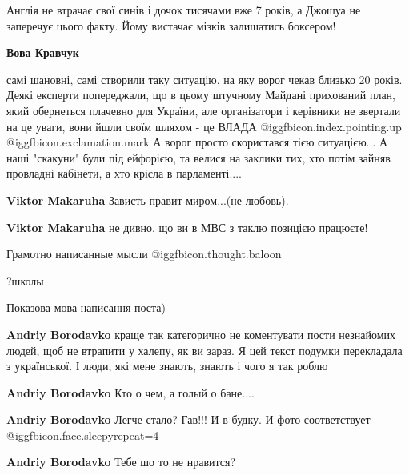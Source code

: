 \begin{itemize}

Англія не втрачає свої синів і дочок тисячами вже 7 років, а Джошуа не
заперечує цього факту. Йому вистачає мізків залишатись боксером!

\begin{itemize} %


\textbf{Вова Кравчук} 

самі шановні, самі створили таку ситуацію, на яку ворог чекав близько 20 років.
Деякі експерти попереджали, що в цьому штучному Майдані прихований план, який
обернеться плачевно для України, але організатори і керівники не звертали на це
уваги, вони йшли своїм шляхом - це ВЛАДА @igg{fbicon.index.pointing.up} ️
@igg{fbicon.exclamation.mark} А ворог просто скористався тією ситуацією... А
наші "скакуни" були під ейфорією, та велися на заклики тих, хто потім зайняв
провладні кабінети, а хто крісла в парламенті....

\textbf{Viktor Makaruha} Зависть правит миром...(не любовь).

\textbf{Viktor Makaruha} не дивно, що ви в МВС з таклю позицією працюєте!
\end{itemize} %

Грамотно написанные мысли  @igg{fbicon.thought.baloon} 

?школы

Показова мова написання поста)

\begin{itemize} %
\textbf{Andriy Borodavko} краще так категорично не коментувати пости незнайомих людей, щоб не втрапити у халепу, як ви зараз. Я цей текст подумки перекладала з української. І люди, які мене знають, знають і чого я так роблю

\textbf{Andriy Borodavko} Кто о чем, а голый о бане....

\textbf{Andriy Borodavko} Легче стало? Гав!!! И в будку. И фото соответствует @igg{fbicon.face.sleepy}{repeat=4} 

\textbf{Andriy Borodavko} Тебе шо то не нравится?


\end{itemize}
\end{itemize}
